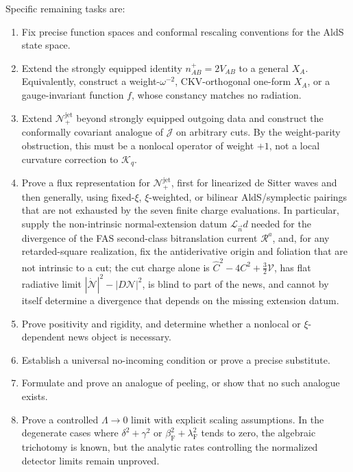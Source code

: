 \documentclass[11pt,a4paper]{article}
\newcommand{\cN}{\mathcal{N}}
\newcommand{\cR}{\mathcal{R}}
\newcommand{\cV}{\mathcal{V}}
\begin{document}
Specific remaining tasks are:
\begin{enumerate}
  \item Fix precise function spaces and conformal rescaling conventions for the AldS state space.
  \item Extend the strongly equipped identity \(n^+_{AB}=2V_{AB}\) to a general \(X_A\).  Equivalently, construct a weight-\(\omega^{-2}\), CKV-orthogonal one-form \(X_A\), or a gauge-invariant function \(f\), whose constancy matches no radiation.
  \item Extend \(\cN^{\mathrm{jet}}_+\) beyond strongly equipped outgoing data and construct the conformally covariant analogue of \(\mathcal J\) on arbitrary cuts.  By the weight-parity obstruction, this must be a nonlocal operator of weight \(+1\), not a local curvature correction to \(\mathcal K_q\).
  \item Prove a flux representation for \(\cN^{\mathrm{jet}}_+\), first for linearized de Sitter waves and then generally, using fixed-\(\xi\), \(\xi\)-weighted, or bilinear AldS/symplectic pairings that are not exhausted by the seven finite charge evaluations.  In particular, supply the non-intrinsic normal-extension datum \(\mathcal L_{\vec n}d\) needed for the divergence of the FAS second-class bitranslation current \(\cR^a\), and, for any retarded-square realization, fix the antiderivative origin and foliation that are not intrinsic to a cut; the cut charge alone is \(\hat C^2-4C^2+\tfrac32\cV\), has flat radiative limit \(|\dot{\mathcal N}|^2-|D\mathcal N|^2\), is blind to part of the news, and cannot by itself determine a divergence that depends on the missing extension datum.
  \item Prove positivity and rigidity, and determine whether a nonlocal or \(\xi\)-dependent news object is necessary.
  \item Establish a universal no-incoming condition or prove a precise substitute.
  \item Formulate and prove an analogue of peeling, or show that no such analogue exists.
  \item Prove a controlled \(\Lambda\to0\) limit with explicit scaling assumptions.  In the degenerate cases where \(\delta^2+\gamma^2\) or \(\beta_{\mathrm F}^2+\lambda_{\mathrm F}^2\) tends to zero, the algebraic trichotomy is known, but the analytic rates controlling the normalized detector limits remain unproved.
\end{enumerate}
\end{document}
